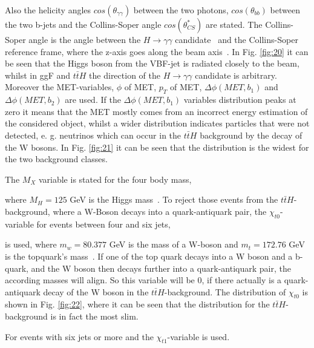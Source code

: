 Also the helicity angles $cos(\theta_{\gamma \gamma})$ between the two photons, $cos(\theta_{bb})$ between the two b-jets and the Collins-Soper angle $cos(\theta_{CS}^*)$ are stated.
The Collins-Soper angle is the angle between the $H \rightarrow \gamma \gamma$ candidate~\cite{Run2analysisnote} and the Collins-Soper reference frame, where the z-axis goes along the beam axis~\cite{CSangle}.
In Fig. \ref{fig:20} it can be seen that the Higgs boson from the VBF-jet is radiated closely to the beam, whilst in ggF and $t \bar{t} H$ the direction of the $H \rightarrow \gamma \gamma$ candidate is arbitrary.
Moreover the MET-variables, $\phi$ of MET, $p_T$ of MET, $\Delta \phi (MET, b_1)$ and $\Delta \phi (MET, b_2)$ are used. If the $\Delta \phi (MET, b_1)$ variables distribution peaks at zero it means 
that the MET mostly comes from an incorrect energy estimation of the considered object, whilst a wider distribution indicates particles that were not detected, e. g. neutrinos which can occur
in the $t \bar{t} H$ background by the decay of the W bosons. In Fig. \ref{fig:21} it can be seen that the distribution is the widest for the two background classes.


The $M_X$ variable is stated for the four body mass,


where $M_H = 125$ GeV is the Higgs mass~\cite{Run2analysisnote}. To reject those events from the $t \bar{t}H$-background, where a W-Boson decays into a quark-antiquark pair, the $\chi_{t0}$-variable for events between four and six jets,


is used, where $m_w=80.377$ GeV is the mass of a W-boson and $m_t=172.76$ GeV is the topquark's mass~\cite{Run2analysisnote}.
If one of the top quark decays into a W boson and a b-quark, and the W boson then decays further into a quark-antiquark pair, the according masses will align. So this variable 
will be $0$, if there actually is a quark-antiquark decay of the W boson in the $t \bar{t}H$-background. The distribution of $\chi_{t0}$ is shown in Fig. \ref{fig:22}, where it can
be seen that the distribution for the $t \bar{t}H$-background is in fact the most slim.

For events with six jets or more and the $\chi_{t1}$-variable is used.


